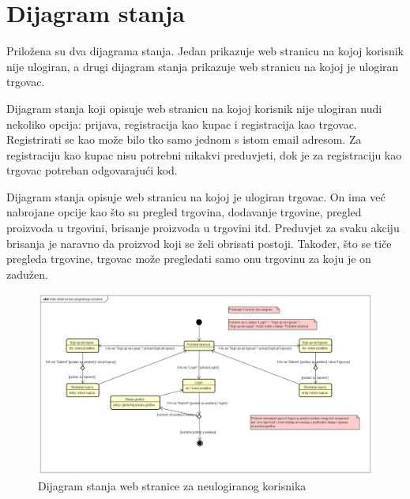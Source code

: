 		\section{Dijagram stanja}
			Priložena su dva dijagrama stanja. Jedan prikazuje web stranicu na kojoj korisnik nije ulogiran, a drugi dijagram stanja prikazuje web stranicu na kojoj je ulogiran trgovac.
			
			Dijagram stanja koji opisuje web stranicu na kojoj korisnik nije ulogiran nudi nekoliko opcija: prijava, registracija kao kupac i registracija kao trgovac. Registrirati se kao može bilo tko samo jednom s istom email adresom. Za registraciju kao kupac nisu potrebni nikakvi preduvjeti, dok je za registraciju kao trgovac potreban odgovarajući kod.
			
			Dijagram stanja opisuje web stranicu na kojoj je ulogiran trgovac. On ima već nabrojane opcije kao što su pregled trgovina, dodavanje trgovine, pregled proizvoda u trgovini, brisanje proizvoda u trgovini itd. Preduvjet za svaku akciju brisanja je naravno da proizvod koji se želi obrisati postoji. Također, što se tiče pregleda trgovine, trgovac može pregledati samo onu trgovinu za koju je on zadužen.
			
			\begin{figure}[H]
				\centering
				\includegraphics[width=1.0\linewidth]{dijagrami/web-neulogiran.jpg}
				\caption{Dijagram stanja web stranice za neulogiranog korisnika}
				\label{fig:state-web-neulogiran}
			\end{figure}
		
